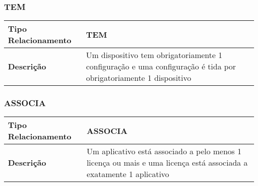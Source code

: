\vspace{1mm}

\subsubsection{TEM}
\label{tem}

\begin{center}
	\begin{tabular}{|p{4.5cm}|p{12.9cm}|}
	\hline

	\textbf{Tipo Relacionamento} & TEM
	\\ \hline

	\textbf{Descrição} & Um dispositivo tem obrigatoriamente 1 configuração e uma configuração é tida por obrigatoriamente 1 dispositivo
	\\ \hline
	\end{tabular}
\end{center}

\vspace{1mm}

\subsubsection{ASSOCIA}
\label{associa}

\begin{center}
	\begin{tabular}{|p{4.5cm}|p{12.9cm}|}
	\hline

	\textbf{Tipo Relacionamento} & ASSOCIA
	\\ \hline

	\textbf{Descrição} & Um aplicativo está associado a pelo menos 1 licença ou mais e uma licença está associada a exatamente 1 aplicativo
	\\ \hline

	\end{tabular}
\end{center}

\vspace{1mm}

